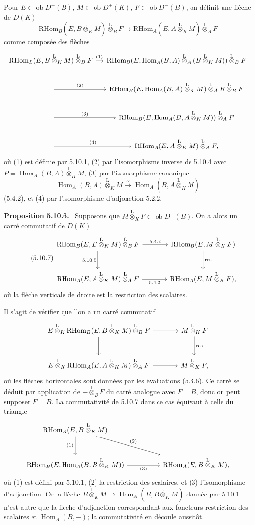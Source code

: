 \documentclass[11pt]{article}
\newenvironment{statement}[1]{\par\medskip\noindent\textbf{#1.}\ }{\par\medskip}
\DeclareMathOperator{\Hom}{Hom}
\newcommand{\ob}{\operatorname{ob}}
\providecommand{\RHom}{\mathrm{RHom}}
\providecommand{\lten}{\overset{\mathrm L}{\otimes}}
\providecommand{\RHom}{\mathrm{RHom}}
\providecommand{\Hom}{\operatorname{Hom}}
\providecommand{\ob}{\operatorname{ob}}
\providecommand{\lten}{\overset{\mathrm L}{\otimes}}
\providecommand{\RHom}{\mathrm R\mathcal{H}om}
\providecommand{\lten}{\overset{\mathrm L}{\otimes}}
\providecommand{\lten}{\overset{\mathrm L}{\otimes}}
\providecommand{\lten}{\overset{\mathrm L}{\otimes}}
\providecommand{\lten}{\overset{\mathrm L}{\otimes}}
\begin{document}
Pour $E\in\ob D^-(B)$, $M\in\ob D^+(K)$, $F\in\ob D^-(B)$, on définit une flèche de $D(K)$
\begin{equation}\tag{5.10.5}
\RHom_B(E,B\lten_KM)\lten_BF\longrightarrow\RHom_A(E,A\lten_KM)\lten_AF
\end{equation}
comme composée des flèches
\[
\begin{tikzcd}[column sep=small]
\RHom_B(E,B\lten_KM)\lten_BF \arrow[r,"(1)"] & \RHom_B(E,\Hom_A(B,A)\lten_A(B\lten_KM))\lten_BF \\
\arrow[r,"(2)"] & \RHom_B(E,\Hom_A(B,A)\lten_KM)\lten_A B\lten_BF \\
\arrow[r,"(3)"] & \RHom_B(E,\Hom_A(B,A\lten_KM))\lten_AF \\
\arrow[r,"(4)"] & \RHom_A(E,A\lten_KM)\lten_AF,
\end{tikzcd}
\]
où (1) est définie par 5.10.1, (2) par l'isomorphisme inverse de 5.10.4 avec $P=\Hom_A(B,A)\lten_KM$, (3) par l'isomorphisme canonique
\[
\Hom_A(B,A)\lten_KM\xrightarrow{\sim}\Hom_A(B,A\lten_KM)
\]
(5.4.2), et (4) par l'isomorphisme d'adjonction 5.2.2.

\begin{statement}{Proposition 5.10.6}
Supposons que $M\lten_KF\in\ob D^+(B)$. On a alors un carré commutatif de $D(K)$
\begin{equation}\tag{5.10.7}
\begin{tikzcd}[column sep=large,row sep=large]
\RHom_B(E,B\lten_KM)\lten_BF \arrow[r,"5.4.2"] \arrow[d,"5.10.5"'] & \RHom_B(E,M\lten_KF) \arrow[d,"\mathrm{res}"]\\
\RHom_A(E,A\lten_KM)\lten_AF \arrow[r,"5.4.2"'] & \RHom_A(E,M\lten_KF),
\end{tikzcd}
\end{equation}
où la flèche verticale de droite est la restriction des scalaires.
\end{statement}

Il s'agit de vérifier que l'on a un carré commutatif
\[
\begin{tikzcd}[column sep=large,row sep=large]
E\lten_K\RHom_B(E,B\lten_KM)\lten_BF \arrow[r] \arrow[d] & M\lten_KF \arrow[d,"\mathrm{res}"]\\
E\lten_K\RHom_A(E,A\lten_KM)\lten_AF \arrow[r] & M\lten_KF,
\end{tikzcd}
\]
où les flèches horizontales sont données par les évaluations (5.3.6). Ce carré se déduit par application de $-\lten_BF$ du carré analogue avec $F=B$, donc on peut supposer $F=B$. La commutativité de 5.10.7 dans ce cas équivaut à celle du triangle
\[
\begin{tikzcd}[column sep=huge,row sep=large]
\RHom_B(E,B\lten_KM) \arrow[d,"(1)"'] \arrow[dr,"(2)"] & \\
\RHom_B(E,\Hom_A(B,B\lten_KM)) \arrow[r,"(3)"'] & \RHom_A(E,B\lten_KM),
\end{tikzcd}
\]
où (1) est défini par 5.10.1, (2) la restriction des scalaires, et (3) l'isomorphisme d'adjonction. Or la flèche $B\lten_KM\to\Hom_A(B,B\lten_KM)$ donnée par 5.10.1 n'est autre que la flèche d'adjonction correspondant aux foncteurs restriction des scalaires et $\Hom_A(B,-)$; la commutativité en découle aussitôt.
\end{document}
